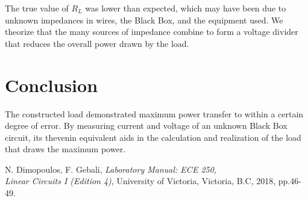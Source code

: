 \documentclass[12pt]{article}
\begin{document}
The true value of \(R_L\) was lower than expected, which may have been due to unknown impedances in wires, the Black Box, and the equipment used.
We theorize that the many sources of impedance combine to form a voltage divider that reduces the overall power drawn by the load.

\section{Conclusion}
The constructed load demonstrated maximum power transfer to within a certain degree of error.
By measuring current and voltage of an unknown Black Box circuit, its thevenin equivalent aids in the calculation and realization of the load that draws the maximum power.

\newpage
{}
\begin{thebibliography}{1}
    N. Dimopoulos, F. Gebali, \textit{Laboratory Manual: ECE 250, \\ Linear Circuits I (Edition 4)}, University of Victoria, Victoria, B.C, 2018, pp.46-49.
\end{thebibliography}
\end{document}
